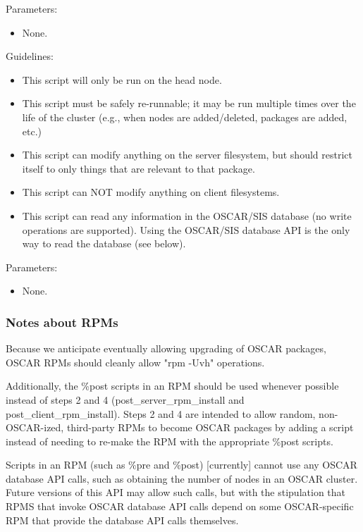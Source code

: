 Parameters:

\begin{itemize}
\item None.
\end{itemize}


Guidelines:

\begin{itemize}
\item This script will only be run on the head node.
\item This script must be safely re-runnable; it may be run multiple times
  over the life of the cluster (e.g., when nodes are added/deleted,
  packages are added, etc.)
\item This script can modify anything on the server filesystem, but should
  restrict itself to only things that are relevant to that package.
\item This script can NOT modify anything on client filesystems.
\item This script can read any information in the OSCAR/SIS database (no
  write operations are supported).  Using the OSCAR/SIS database API
  is the only way to read the database (see below).
\end{itemize}


Parameters:

\begin{itemize}
\item None.
\end{itemize}


\subsubsection{Notes about RPMs}

Because we anticipate eventually allowing upgrading of OSCAR packages,
OSCAR RPMs should cleanly allow "rpm -Uvh" operations.

Additionally, the \%post scripts in an RPM should be used whenever
possible instead of steps 2 and 4 (post\_server\_rpm\_install and
post\_client\_rpm\_install).  Steps 2 and 4 are intended to allow random,
non-OSCAR-ized, third-party RPMs to become OSCAR packages by adding a
script instead of needing to re-make the RPM with the appropriate
\%post scripts.

Scripts in an RPM (such as \%pre and \%post) [currently] cannot use any
OSCAR database API calls, such as obtaining the number of nodes in an
OSCAR cluster.  Future versions of this API may allow such calls, but
with the stipulation that RPMS that invoke OSCAR database API calls
depend on some OSCAR-specific RPM that provide the database API calls
themselves.


